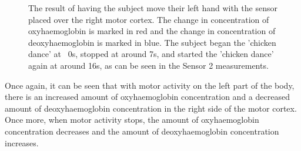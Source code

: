 \begin{figure}[htp]
\centering
{}
\caption[Left Motor Cortex Measurements with Motor Movement]{The result of having the subject move their left hand with the sensor placed over the right motor cortex. The change in concentration of oxyhaemoglobin is marked in red and the change in concentration of deoxyhaemoglobin is marked in blue. The subject began the 'chicken dance' at ~0s, stopped at around 7s, and started the 'chicken dance' again at around 16s, as can be seen in the Sensor 2 measurements.}
\end{figure}

Once again, it can be seen that with motor activity on the left part of the body, there is an increased amount of oxyhaemoglobin concentration and a decreased amount of deoxyhaemoglobin concentration in the right side of the motor cortex. Once more, when motor activity stops, the amount of oxyhaemoglobin concentration decreases and the amount of deoxyhaemoglobin concentration increases.

